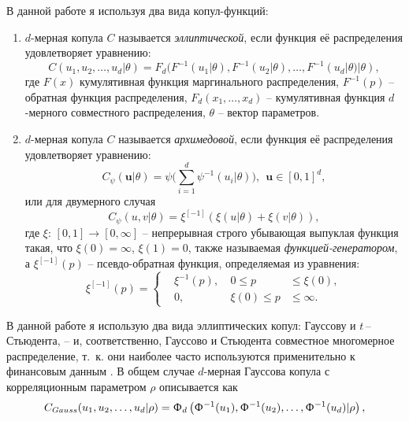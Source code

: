 В данной работе я используя два вида копул-функций:
%
\begin{enumerate}[(1)]
\item $d$-мерная копула $C$ называется \textit{эллиптической}, если функция её распределения удовлетворяет уравнению:
\begin{equation} \label{EllipCop}
    C(u_1, u_2, \ldots,u_d|\theta) = F_d(F^{-1}(u_1|\theta), F^{-1}(u_2|\theta), \ldots, F^{-1}(u_d|\theta)|\theta),
\end{equation}
где $F(x)$ кумулятивная функция маргинального распределения, $F^{-1}(p)$ -- обратная функция распределения, $F_d(x_1,\dots,x_d)$ -- кумулятивная функция $d$-мерного совместного распределения, $\theta$ -- вектор параметров.

\item $d$-мерная копула $C$ называется \textit{архимедовой}, если функция её распределения удовлетворяет уравнению:
%
\begin{equation} \label{ArchCop}
    C_\psi(\textbf{u}|\theta) = \psi\Big(\sum_{i=1}^d \psi^{-1}(u_i|\theta) \Big), \ \ \textbf{u} \in [0, 1]^d,
\end{equation}
%
\noindent или для двумерного случая
%
\begin{equation}
    C_\psi(u, v|\theta) = \xi^{[-1]}(\xi(u|\theta)+\xi(v|\theta)),
\end{equation}
%
где $\xi$: $[0,1] \rightarrow [0, \infty]$ -- непрерывная строго убывающая выпуклая функция такая, что $\xi(0)=\infty$, $\xi(1)=0$, также называемая \textit{функцией-генератором}, а $\xi^{[-1]}(p)$ -- псевдо-обратная функция, определяемая из уравнения:
$$\xi^{[-1]}(p) = \left\{ \begin{aligned}
    & \xi^{-1}(p), & \ 0 \le p & \le \xi(0), \\
    & 0,           & \ \xi(0) \le p & \le \infty.
\end{aligned} \right.$$
\end{enumerate}

В данной работе я использую два вида эллиптических копул: Гауссову и $t$\,--\,Стьюдента, -- и, соответственно, Гауссово и Стьюдента совместное многомерное распределение, т.~к. они наиболее часто используются применительно к финансовым данным \cite{Lourme2016}. 
В общем случае $d$-мерная Гауссова копула с корреляционным параметром $\rho$ описывается как
%
\begin{equation} \label{nCop}
C_{Gauss}(u_1,u_2,\ldots,u_d|\rho) = \Upphi_d \left( \Upphi^{-1} (u_1), \Upphi^{-1} (u_2), \ldots, \Upphi^{-1} (u_d) | \rho \right),
\end{equation}

